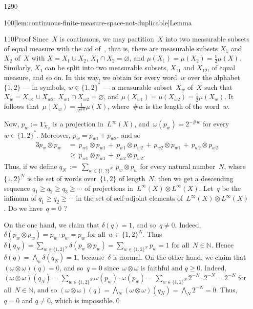 \begin{parsec}{1290}
\begin{point}{100}[lem:continuous-finite-measure-space-not-duplicable]{Lemma}
\begin{point}{110}{Proof}
Since~$X$ is continuous,
we may partition~$X$ into two measurable
subsets of equal measure 
with the aid of~,
that is,
there are measurable subsets $X_{1}$ and~$X_{2}$
of~$X$ with $X=X_{1}\cup X_{2}$, $X_{1}\cap X_{2}=\varnothing$,
and
$\mu(X_{1})=\mu(X_{2})=\frac{1}{2}\mu(X)$.
Similarly, $X_{1}$ 
can be split into two measurable subsets, $X_{11}$ and $X_{12}$,
of equal measure, and so on.
In this way,
we obtain for every word~$w$ over the alphabet~$\{1,2\}$
--- in symbols, $w\in \{1,2\}^*$ ---
a measurable subset~$X_w$ of~$X$
such that $X_w = X_{w1}\cup X_{w2}$,
$X_{w1}\cap X_{w2}=\varnothing$,
and $\mu(X_{w1})=\mu(X_{w2})=\frac{1}{2}\mu(X_w)$.
It follows that~$\mu(X_w)=\frac{1}{2^{\#w}}\mu(X)$,
where~$\#w$ is the length of the word~$w$.

Now, $p_w := \mathbf{1}_{X_w}^\circ$ is a projection in~$L^\infty(X)$,
and~$\omega(p_w)=2^{-\#w}$
for every~$w\in\{1,2\}^*$.
Moreover, $p_w = p_{w1}+p_{w2}$,
and so
\begin{alignat*}{3}
p_w\otimes p_w 
\ &=\  
p_{w1}\otimes p_{w1} \,+\,
p_{w1}\otimes p_{w2} \,+\,
p_{w2}\otimes p_{w1} \,+\,
p_{w2}\otimes p_{w2}\\
\ &\geq\ 
p_{w1}\otimes p_{w1} \,+\,
p_{w2}\otimes p_{w2}.
\end{alignat*}
Thus, if we define 
$q_N\ :=\ \sum_{w\in \{1,2\}^N}\,p_w\otimes p_w$
for every natural number~$N$,
where~$\{1,2\}^N$ is the set of words over~$\{1,2\}$ of length~$N$,
then we get a descending sequence $q_1\geq q_2\geq q_3\geq \dotsb$
of projections in~$L^\infty(X)\otimes L^\infty(X)$.
Let~$q$ be the infimum of $q_1\geq q_2 \geq \dotsb$ 
in the set of self-adjoint elements of~$L^\infty(X)\otimes
L^\infty(X)$.
Do we have~$q=0$ ?

On the one hand,
we claim that $\delta(q)=1$, and so~$q\neq 0$.
Indeed,
$\delta(p_w\otimes p_w)=p_w\cdot p_w = p_w$
for all~$w\in \{1,2\}^N$.
Thus $\delta(q_N) = \sum_{w\in \{1,2\}^N}  \delta(p_w\otimes p_w)
= \sum_{w\in\{1,2\}^N} p_w=1$ for all~$N\in \mathbb{N}$.
Hence $\delta(q)=\bigwedge_n \delta(q_N) = 1$,
because~$\delta$ is normal.
On the other hand,
we claim that $(\omega\otimes \omega)(q)=0$,
and so~$q=0$ since~$\omega\otimes \omega$ is 
faithful and $q\geq 0$.
Indeed,
$(\omega\otimes\omega)(q_N)=
\sum_{w\in\{1,2\}^N} \omega(p_w)\cdot\omega(p_w)
= \sum_{w\in\{1,2\}^N} 2^{-N}\cdot 2^{-N} = 2^{-N}$
for all~$N\in \mathbb{N}$,
	and so $(\omega\otimes\omega)(q)
=\bigwedge_N (\omega\otimes\omega)(q_N) = \bigwedge_N 2^{-N}=0$.
Thus, $q=0$ and $q\neq 0$, which is impossible.\qed
\end{point}
\end{point}
\end{parsec}
